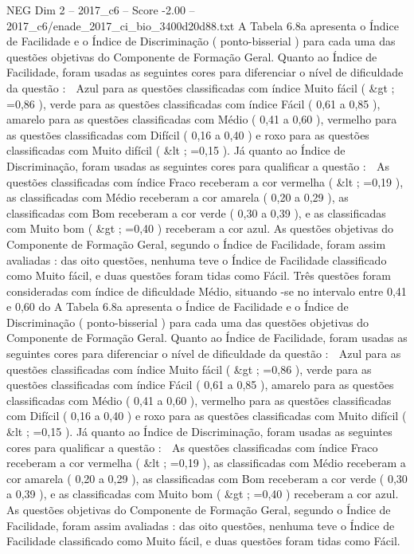\begin{textsample}{NEG Dim 2 – 2017\_c6 – Score -2.00 – 2017\_c6/enade\_2017\_ci\_bio\_3400d20d88.txt}
A Tabela 6.8a apresenta o Índice de Facilidade e o Índice de Discriminação ( ponto-bisserial ) para cada uma das questões objetivas do Componente de Formação Geral.
Quanto ao Índice de Facilidade, foram usadas as seguintes cores para diferenciar o nível de dificuldade da questão :  Azul para as questões classificadas com índice Muito fácil ( \&gt ; =0,86 ), verde para as questões classificadas com índice Fácil ( 0,61 a 0,85 ), amarelo para as questões classificadas com Médio ( 0,41 a 0,60 ), vermelho para as questões classificadas com Difícil ( 0,16 a 0,40 ) e roxo para as questões classificadas com Muito difícil ( \&lt ; =0,15 ).
Já quanto ao Índice de Discriminação, foram usadas as seguintes cores para qualificar a questão :  As questões classificadas com índice Fraco receberam a cor vermelha ( \&lt ; =0,19 ), as classificadas com Médio receberam a cor amarela ( 0,20 a 0,29 ), as classificadas com Bom receberam a cor verde ( 0,30 a 0,39 ), e as classificadas com Muito bom ( \&gt ; =0,40 ) receberam a cor azul.
As questões objetivas do Componente de Formação Geral, segundo o Índice de Facilidade, foram assim avaliadas : das oito questões, nenhuma teve o Índice de Facilidade classificado como Muito fácil, e duas questões foram tidas como Fácil.
Três questões foram consideradas com índice de dificuldade Médio, situando -se no intervalo entre 0,41 e 0,60 do A Tabela 6.8a apresenta o Índice de Facilidade e o Índice de Discriminação ( ponto-bisserial ) para cada uma das questões objetivas do Componente de Formação Geral.
Quanto ao Índice de Facilidade, foram usadas as seguintes cores para diferenciar o nível de dificuldade da questão :  Azul para as questões classificadas com índice Muito fácil ( \&gt ; =0,86 ), verde para as questões classificadas com índice Fácil ( 0,61 a 0,85 ), amarelo para as questões classificadas com Médio ( 0,41 a 0,60 ), vermelho para as questões classificadas com Difícil ( 0,16 a 0,40 ) e roxo para as questões classificadas com Muito difícil ( \&lt ; =0,15 ).
Já quanto ao Índice de Discriminação, foram usadas as seguintes cores para qualificar a questão :  As questões classificadas com índice Fraco receberam a cor vermelha ( \&lt ; =0,19 ), as classificadas com Médio receberam a cor amarela ( 0,20 a 0,29 ), as classificadas com Bom receberam a cor verde ( 0,30 a 0,39 ), e as classificadas com Muito bom ( \&gt ; =0,40 ) receberam a cor azul.
As questões objetivas do Componente de Formação Geral, segundo o Índice de Facilidade, foram assim avaliadas : das oito questões, nenhuma teve o Índice de Facilidade classificado como Muito fácil, e duas questões foram tidas como Fácil.

\end{textsample}
